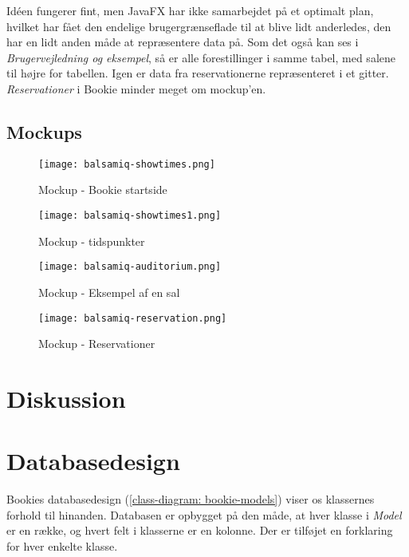 Idéen fungerer fint, men JavaFX har ikke samarbejdet på et optimalt plan, hvilket har fået den endelige brugergrænseflade til at blive lidt anderledes, den har en lidt anden måde at repræsentere data på. Som det også kan ses i \textit{Brugervejledning og eksempel}, så er alle forestillinger i samme tabel, med salene til højre for tabellen. Igen er data fra reservationerne repræsenteret i et gitter. \textit{Reservationer} i Bookie minder meget om mockup'en. 


\subsection{Mockups}

\begin{figure}[h]
  \centering
  \texttt{[image: balsamiq-showtimes.png]}
  \caption{Mockup - Bookie startside}
  \label{mockup: balsamiq-showtimes}
\end{figure}

\begin{figure}[h]
  \centering
  \texttt{[image: balsamiq-showtimes1.png]}
  \caption{Mockup - tidspunkter}
  \label{mockup: balsamiq-showtimes1}
\end{figure}

\begin{figure}[h]
  \centering
  \texttt{[image: balsamiq-auditorium.png]}
  \caption{Mockup - Eksempel af en sal}
  \label{mockup: balsamiq-auditorium}
\end{figure}

\begin{figure}[h]
  \centering
  \texttt{[image: balsamiq-reservation.png]}
  \caption{Mockup - Reservationer}
  \label{mockup: balsamiq-reservation}
\end{figure}

\section{Diskussion}

\section{Databasedesign}

Bookies databasedesign (\ref{class-diagram: bookie-models}) viser os klassernes forhold til hinanden. Databasen er opbygget på den måde, at hver klasse i \textit{Model} er en række, og hvert felt i klasserne er en kolonne. Der er tilføjet en forklaring for hver enkelte klasse.

